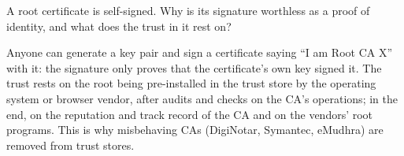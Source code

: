 \begin{exercise}
A root certificate is self-signed. Why is its signature worthless as a proof of identity, and what does the trust in it rest on?
\end{exercise}
\begin{solution}
Anyone can generate a key pair and sign a certificate saying \enquote{I am Root CA X} with it: the signature only proves that the certificate's own key signed it. The trust rests on the root being pre-installed in the trust store by the operating system or browser vendor, after audits and checks on the CA's operations; in the end, on the reputation and track record of the CA and on the vendors' root programs. This is why misbehaving CAs (DigiNotar, Symantec, eMudhra) are removed from trust stores.
\end{solution}
